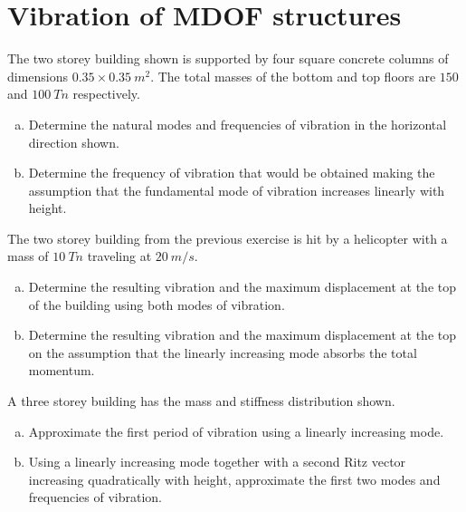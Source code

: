 \section{Vibration of MDOF structures}


The two storey building shown is supported by four square concrete columns of dimensions $0.35 \times 0.35\ m^2$. The total masses of the bottom and top floors are $150$ and $100\ Tn$ respectively.
\begin{enumerate}[(a)]
    \item Determine the natural modes and frequencies of vibration in the horizontal direction shown.
    \item Determine the frequency of vibration that would be obtained making the assumption that the fundamental mode of vibration increases linearly with height.
\end{enumerate}

\begin{center}
\end{center}



The two storey building from the previous exercise is hit by a helicopter with a mass of $10\ Tn$ traveling at $20\ m/s$.
\begin{enumerate}[(a)]
    \item Determine the resulting vibration and the maximum displacement at the top of the building using both modes of vibration.
    \item Determine the resulting vibration and the maximum displacement at the top on the assumption that the linearly increasing mode absorbs the total momentum.
\end{enumerate}



A three storey building has the mass and stiffness distribution shown.

\begin{enumerate}[(a)]
    \item Approximate the first period of vibration using a linearly increasing mode.
    \item Using a linearly increasing mode together with a second Ritz vector increasing quadratically with height, approximate the first two modes and frequencies of vibration.
\end{enumerate}    

\begin{center}
\end{center}
